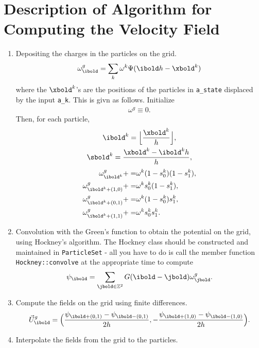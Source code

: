 \documentclass[11pt]{article}
\begin{document}
\section*{Description of Algorithm for Computing the Velocity Field}
\begin{enumerate}
\item Depositing the charges in the particles on the grid.
\begin{gather*}
\omega^g_\ibold = \sum \limits_k \omega^k \Psi(\ibold h - \xbold^k)
\end{gather*}
where the $\xbold^k$'s are the positions of the particles in {\tt a\_state} displaced by the input {\tt a\_k}.
This is givn as follows. Initialize
\begin{gather*}
\omega^g \equiv 0.
\end{gather*}
Then, for each particle,
\begin{gather*}
\ibold^k =  \Big \lfloor \frac{\xbold^k}{h} \Big \rfloor , \\
\sbold^k = \frac{\xbold^k - \ibold^k h}{h} ,
\end{gather*}
\begin{align*}
\omega^g_{\ibold^k} += & \omega^k (1 - s^k_0)(1-s^k_1) ,\\
\omega^g_{\ibold^k + (1,0)} += & \omega^k s^k_0 (1 - s^k_1) ,\\
\omega^g_{\ibold^k + (0,1)} += & \omega^k (1 - s^k_0) s^k_1 ,\\
\omega^g_{\ibold^k + (1,1)} += & \omega^k s^k_0 s^k_1 .
\end{align*}
\item Convolution with the Green's function to obtain the potential on the grid, using Hockney's algorithm. The Hockney class should be constructed and maintained in {\tt ParticleSet} - all you have to do is call the member function {\tt Hockney::convolve} at the appropriate time to compute
\begin{gather*}
\psi_\ibold = \sum \limits_{\jbold \in \mathbb{Z}^2} G(\ibold - \jbold) \omega^g_\jbold .
\end{gather*}
\item Compute the fields on the grid using finite differences.
\begin{gather*}
\vec{U}^g_\ibold = \Big (\frac{\psi_{\ibold + (0,1)} - \psi_{\ibold - (0,1)}}{2 h} , -\frac{\psi_{\ibold + (1,0)} - \psi_{\ibold - (1,0)}}{2 h} \Big ).
\end{gather*}
\item Interpolate the fields from the grid to the particles.  
\begin{gather*}

\end{gather*}
\end{enumerate}
\end{document}
